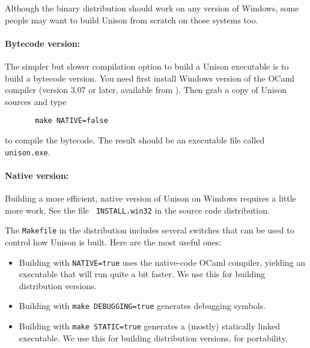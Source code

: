 \documentclass{article}
\begin{document}

Although the binary distribution should work on any version of Windows,
some people may want to build Unison from scratch on those systems too.

\paragraph{Bytecode version:} The simpler but slower compilation option
to build a Unison executable is to build a bytecode version.  You need
first install Windows version of the OCaml compiler (version 3.07 or
later, available from ).  Then grab a copy
of Unison sources and type
\begin{verbatim}
       make NATIVE=false
\end{verbatim}
to compile the bytecode.  The result should be an executable file called
\verb|unison.exe|.

\paragraph{Native version:} Building a more efficient, native version of
Unison on Windows requires a little more work.  See the file {\tt
  INSTALL.win32} in the source code distribution.



The \verb|Makefile| in the distribution includes several switches that
can be used to control how Unison is built.  Here are the most useful
ones:
\begin{itemize}
\item Building with \verb|NATIVE=true| uses the native-code OCaml
compiler, yielding an executable that will run quite a bit faster. We use
this for building distribution versions.
\item Building with \verb|make DEBUGGING=true| generates debugging
symbols.
\item Building with \verb|make STATIC=true| generates a (mostly)
statically linked executable.  We use this for building distribution
versions, for portability.
\end{itemize}




\end{document}
